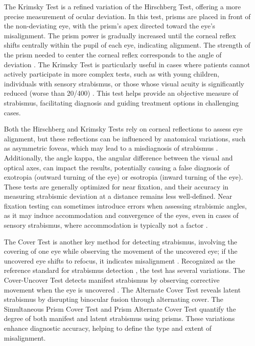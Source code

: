 \documentclass{article}
\begin{document}
The Krimsky Test is a refined variation of the Hirschberg Test, offering a more precise measurement of ocular deviation. In this test, prisms are placed in front of the non-deviating eye, with the prism’s apex directed toward the eye’s misalignment. The prism power is gradually increased until the corneal reflex shifts centrally within the pupil of each eye, indicating alignment. The strength of the prism needed to center the corneal reflex corresponds to the angle of deviation \cite{4,5}. The Krimsky Test is particularly useful in cases where patients cannot actively participate in more complex tests, such as with young children, individuals with sensory strabismus, or those whose visual acuity is significantly reduced (worse than 20/400) \cite{6,7}. This test helps provide an objective measure of strabismus, facilitating diagnosis and guiding treatment options in challenging cases.

Both the Hirschberg and Krimsky Tests rely on corneal reflections to assess eye alignment, but these reflections can be influenced by anatomical variations, such as asymmetric foveas, which may lead to a misdiagnosis of strabismus \cite{13}. Additionally, the angle kappa, the angular difference between the visual and optical axes, can impact the results, potentially causing a false diagnosis of exotropia (outward turning of the eye) or esotropia (inward turning of the eye). These tests are generally optimized for near fixation, and their accuracy in measuring strabismic deviation at a distance remains less well-defined. Near fixation testing can sometimes introduce errors when assessing strabismic angles, as it may induce accommodation and convergence of the eyes, even in cases of sensory strabismus, where accommodation is typically not a factor \cite{14}.

The Cover Test is another key method for detecting strabismus, involving the covering of one eye while observing the movement of the uncovered eye; if the uncovered eye shifts to refocus, it indicates misalignment \cite{8}. Recognized as the reference standard for strabismus detection \cite{8}, the test has several variations. The Cover-Uncover Test detects manifest strabismus by observing corrective movement when the eye is uncovered \cite{8}. The Alternate Cover Test reveals latent strabismus by disrupting binocular fusion through alternating cover. The Simultaneous Prism Cover Test and Prism Alternate Cover Test quantify the degree of both manifest and latent strabismus using prisms. These variations enhance diagnostic accuracy, helping to define the type and extent of misalignment.
\end{document}

